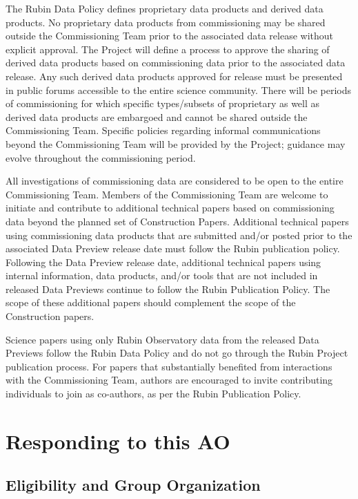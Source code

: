 \documentclass[SE,authoryear,toc]{lsstdoc}
\begin{document}
The Rubin Data Policy  defines proprietary data products and derived data products. No proprietary data products from commissioning may be shared outside the Commissioning Team prior to the associated data release without explicit approval. The Project will define a process to approve the sharing of derived data products based on commissioning data prior to the associated data release. Any such derived data products approved for release must be presented in public forums accessible to the entire science community. There will be periods of commissioning for which specific types/subsets of proprietary as well as derived data products are embargoed and cannot be shared outside the Commissioning Team. Specific policies regarding informal communications beyond the Commissioning Team will be provided by the Project; guidance may evolve throughout the commissioning period. 

All investigations of commissioning data are considered to be open to the entire Commissioning Team. Members of the Commissioning Team are welcome to initiate and contribute to additional technical papers based on commissioning data beyond the planned set of Construction Papers. Additional technical papers using commissioning data products that are submitted and/or posted prior to the associated Data Preview release date must follow the Rubin publication policy. Following the Data Preview release date, additional technical papers using internal information, data products, and/or tools that are not included in released Data Previews continue to follow the Rubin Publication Policy. The scope of these additional papers should complement the scope of the Construction papers.

Science papers using only Rubin Observatory data from the released Data Previews follow the Rubin Data Policy  and do not go through the Rubin Project publication process. For papers that substantially benefited from interactions with the Commissioning Team, authors are encouraged to invite contributing individuals to join as co-authors, as per the Rubin Publication Policy.

\section{Responding to this AO}
\label{loi}

\subsection{Eligibility and Group Organization}
\label{eligibility}
\end{document}
